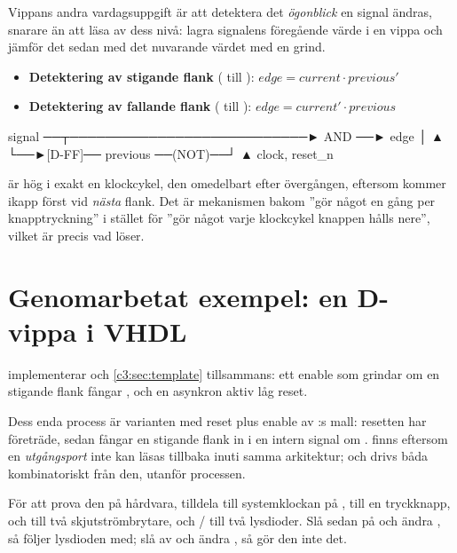 Vippans andra vardagsuppgift är att detektera det \emph{ögonblick} en signal ändras, snarare än att
läsa av dess nivå: lagra signalens föregående värde i en vippa och jämför det sedan med det
nuvarande värdet med en grind.

\begin{itemize}
  \item \textbf{Detektering av stigande flank} ( till ):
    $\mathit{edge} = \mathit{current} \cdot \mathit{previous}'$
  \item \textbf{Detektering av fallande flank} ( till ):
    $\mathit{edge} = \mathit{current}' \cdot \mathit{previous}$
\end{itemize}

\begin{textdrawing}
signal ──┬───────────────────────────► AND ──► edge
         │                              ▲
         └──►[D-FF]── previous ──(NOT)──┘
                ▲
           clock, reset_n
\end{textdrawing}

 är hög i exakt en klockcykel, den omedelbart efter övergången, eftersom
 kommer ikapp först vid \emph{nästa} flank. Det är mekanismen bakom ”gör något en
gång per knapptryckning” i stället för ”gör något varje klockcykel knappen hålls nere”, vilket är
precis vad  löser.

\section{Genomarbetat exempel: en D-vippa i VHDL}
\label{c3:sec:dffvhdl}

 implementerar  och \ref{c3:sec:template} tillsammans: ett
enable som grindar om en stigande flank fångar , och en asynkron aktiv låg reset.


Dess enda process är varianten med reset plus enable av :s mall: resetten
har företräde, sedan fångar en stigande flank  in i en intern signal  om
.  finns eftersom en \emph{utgångsport} inte kan läsas tillbaka inuti
samma arkitektur;  och  drivs båda kombinatoriskt från den, utanför processen.

För att prova den på hårdvara, tilldela  till systemklockan på ,
 till en tryckknapp,  och  till två skjutströmbrytare, och
/ till två lysdioder. Slå sedan på  och ändra , så följer
lysdioden med; slå av  och ändra , så gör den inte det.

